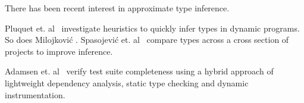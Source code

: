 There has been recent interest in approximate type inference.

Pluquet et. al~\cite{marot2009fast} investigate heuristics
to quickly infer types in dynamic programs.
So does Milojkovi{\'c}
\cite{milojkovic2016exploring}.
Spasojevi{\'c} et. al~\cite{spasojevic2014mining}
compare types across a cross section of projects to improve
inference.

Adamsen et. al~\cite{adamsen2016analyzing} verify test suite completeness using a hybrid approach of lightweight dependency analysis, static type checking and dynamic instrumentation.


